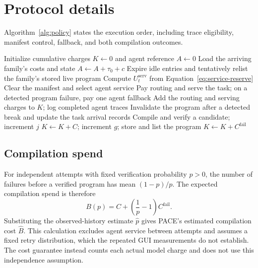 \section{Protocol details}\label{app:protocol-details}

Algorithm~\ref{alg:policy} states the execution order, including trace eligibility, manifest control, fallback, and both compilation outcomes.
\begin{algorithm}[htbp]
\caption{PACE with extra-cost margin $\epsilon$.
Family identities, cost profiles, routing charges, and the scenario hazard are supplied.}
\label{alg:policy}
\begin{algorithmic}[1]
\State Initialize cumulative charges $K\gets0$ and agent reference $A\gets0$
\State Load the arriving family's costs and state
\State $A\gets A+\tau_0+c$
\State Expire idle entries and tentatively relist the family's stored live program
\State Compute $U_t^{\mathrm{serv}}$ from Equation~\ref{eq:service-reserve}
\State Clear the manifest and select agent service
\EndIf
\State Pay routing and serve the task; on a detected program failure, pay one agent fallback
\State Add the routing and serving charges to $K$; log completed agent traces
\State Invalidate the program after a detected break and update the task arrival records
\State Compile and verify a candidate; increment $j$
\State $K\gets K+C$; increment $g$; store and list the program
\Else
\State $K\gets K+C^{\mathrm{fail}}$
\EndIf
\EndIf
\EndIf
\EndFor
\end{algorithmic}
\end{algorithm}

\subsection{Compilation spend}
\label{app:reference}
\label{sec:breakeven}
For independent attempts with fixed verification probability $p>0$, the number of failures before a verified program has mean $(1-p)/p$.
The expected compilation spend is therefore
\begin{equation}
B(p)=C+\left(\frac1p-1\right)C^{\mathrm{fail}}.
\label{eq:breakeven-law}
\end{equation}
Substituting the observed-history estimate $\hat p$ gives PACE's estimated compilation cost $\hat B$.
This calculation excludes agent service between attempts and assumes a fixed retry distribution, which the repeated GUI measurements do not establish.
The cost guarantee instead counts each actual model charge and does not use this independence assumption.

